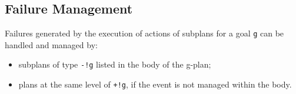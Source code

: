 %
%
%
%
%
%
%
%
% 
% 

 \subsection{Failure Management}

 Failures generated by the execution of actions of subplans for a
 goal \texttt{g} can be handled and managed by:

\begin{itemize}
\item subplans of type \texttt{-!g} listed in the body of the g-plan;
\item plans at the same level of \texttt{+!g}, if the event is not
  managed within the body.
\end{itemize}

